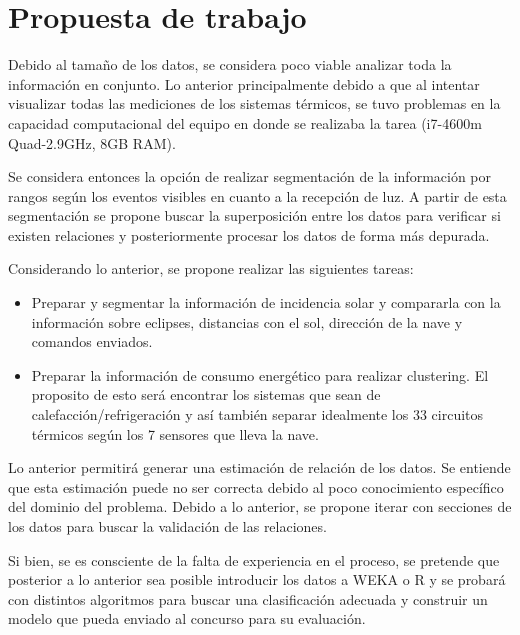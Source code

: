 \documentclass[../Main.tex]{subfiles}
\begin{document}
\section{Propuesta de trabajo}
Debido al tamaño de los datos, se considera poco viable analizar toda la información en conjunto. Lo anterior principalmente debido a que al intentar visualizar todas las mediciones de los sistemas térmicos, se tuvo problemas en la capacidad computacional del equipo en donde se realizaba la tarea (i7-4600m Quad-2.9GHz, 8GB RAM).
\newline \par
Se considera entonces la opción de realizar segmentación de la información por rangos según los eventos visibles en cuanto a la recepción de luz. A partir de esta segmentación se propone buscar la superposición entre los datos para verificar si existen relaciones y posteriormente procesar los datos de forma más depurada.
\newline \par
Considerando lo anterior, se propone realizar las siguientes tareas:

\begin{itemize}
    \item Preparar y segmentar la información de incidencia solar y compararla con la información sobre eclipses, distancias con el sol, dirección de la nave y comandos enviados.
	\item Preparar la información de consumo energético para realizar clustering. El proposito de esto será encontrar los sistemas que sean de calefacción/refrigeración y así también separar idealmente los 33 circuitos térmicos según los 7 sensores que lleva la nave.
\end{itemize}

Lo anterior permitirá generar una estimación de relación de los datos. Se entiende que esta estimación puede no ser correcta debido al poco conocimiento específico del dominio del problema. Debido a lo anterior, se propone iterar con secciones de los datos para buscar la validación de las relaciones.
\newline \par
Si bien, se es consciente de la falta de experiencia en el proceso, se pretende que posterior a lo anterior sea posible introducir los datos a WEKA o R y se probará con distintos algoritmos para buscar una clasificación adecuada y construir un modelo que pueda enviado al concurso para su evaluación.
\end{document}

